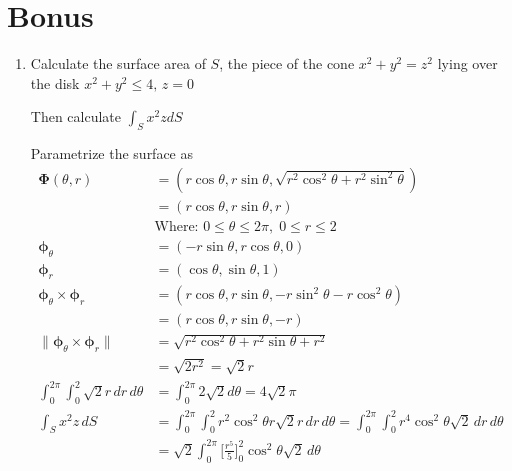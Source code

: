 \documentclass{article}
\newcommand{\norm}[1]{\| #1 \|}
\begin{document}
\section*{Bonus}

\begin{enumerate}[label=(\alph*)]
    \item Calculate the surface area of $S$, the piece of the cone $x^2 + y^2 = z^2$ lying over the disk $x^2 + y^2 \leq 4,\, z=0$
    
    Then calculate $\displaystyle \int_Sx^2zdS$
    
    Parametrize the surface as
    \begin{align*} 
    \boldsymbol \Phi (\theta, r) &= (r\cos \theta, r\sin \theta, \sqrt{r^2\cos^2\theta + r^2\sin^2\theta}) \\
    &= (r\cos \theta, r\sin \theta, r) \\
    &\text{Where: } 0 \leq \theta \leq 2\pi, \; 0 \leq r \leq 2 \\
    \boldsymbol \phi_{\theta} &= (-r\sin \theta, r\cos \theta, 0)\\
    \boldsymbol \phi_{r} &= (\cos \theta, \sin \theta, 1)\\
    \boldsymbol \phi_{\theta} \times \boldsymbol \phi_{r} &= (r\cos\theta, r\sin\theta, -r\sin^2\theta - r\cos^2\theta) \\
    &= (r\cos\theta, r\sin\theta, -r) \\
    \norm{\boldsymbol \phi_{\theta} \times \boldsymbol \phi_{r}} &= \sqrt{r^2\cos^2\theta + r^2\sin\theta + r^2} \\
    &= \sqrt{2r^2} = \sqrt{2}r\\
    \int_0^{2\pi} \int_0^2 \sqrt{2}r \, dr \, d\theta &= \int_0^{2\pi} 2 \sqrt{2} d \theta = 4\sqrt 2 \pi \\
    \int_S x^2 z \, dS \, &= \int_0^{2\pi} \int_0^2 r^2 \cos^2 \theta r\sqrt 2 r \, dr \, d \theta = \int_0^{2\pi} \int_0^2 r^4 \cos^2 \theta \sqrt 2 \, dr \, d \theta \\
    &= \sqrt{2}\int_0^{2\pi} \Big[ \frac{r^5}{5}\Big]_0^2 \cos^2 \theta \sqrt 2 \, d \theta \\

    \end{align*}
\end{enumerate}
\end{document}
